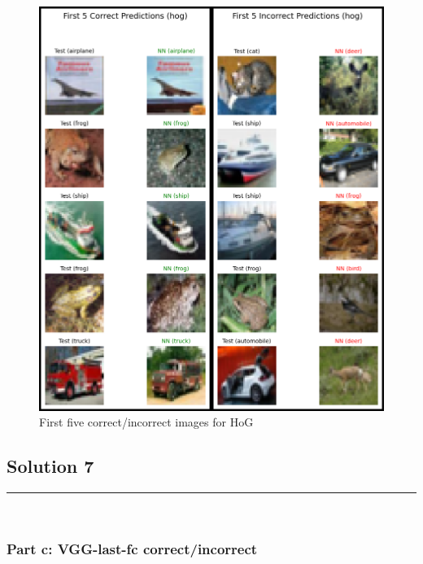 \documentclass{article}
\begin{document}
\begin{figure}[h]
  \includegraphics[height=0.75\textheight,width=\textwidth]{hog.png}
  \caption{First five correct/incorrect images for HoG}
\end{figure}

\newpage

\subsection*{Solution 7}
\noindent\rule{\textwidth}{0.4pt}\\
\subsubsection*{Part c:  VGG-last-fc correct/incorrect}
\end{document}
